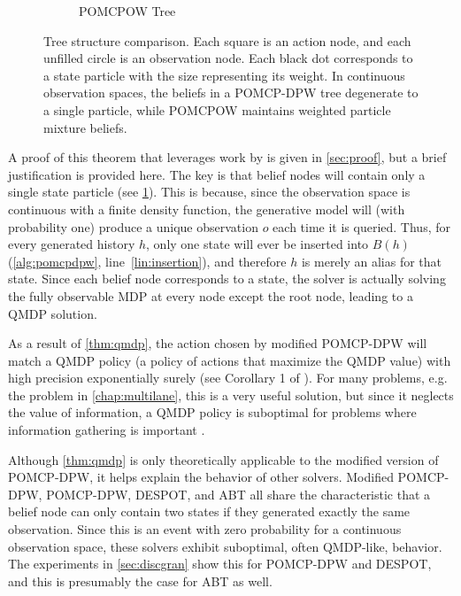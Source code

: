 \begin{figure}[htpb]
\begin{subfigure}[b]{0.45\columnwidth}
        \caption{POMCPOW Tree}
    \end{subfigure}
    \caption[POMCP-DPW and POMCPOW tree structure comparison]{Tree structure comparison. Each square is an action node, and each unfilled circle is an observation node. Each black dot corresponds to a state particle with the size representing its weight. In continuous observation spaces, the beliefs in a POMCP-DPW tree degenerate to a single particle, while POMCPOW maintains weighted particle mixture beliefs.}
    \label{fig:treecomp}
\end{figure}



A proof of this theorem that leverages work by \citet{auger2013continuous} is given in \cref{sec:proof}, but a brief justification is provided here.
The key is that belief nodes will contain only a single state particle (see \cref{fig:treecomp}).
This is because, since the observation space is continuous with a finite density function, the generative model will (with probability one) produce a unique observation $o$ each time it is queried.
Thus, for every generated history $h$, only one state will ever be inserted into $B(h)$ (\cref{alg:pomcpdpw}, line~\ref{lin:insertion}), and therefore $h$ is merely an alias for that state. 
Since each belief node corresponds to a state, the solver is actually solving the fully observable MDP at every node except the root node, leading to a QMDP solution.

As a result of \cref{thm:qmdp}, the action chosen by modified POMCP-DPW will match a QMDP policy (a policy of actions that maximize the QMDP value) with high precision exponentially surely (see Corollary 1 of \citet{auger2013continuous}).
For many problems, e.g. the problem in \cref{chap:multilane}, this is a very useful solution, but since it neglects the value of information, a QMDP policy is suboptimal for problems where information gathering is important \cite{littman1995learning,kochenderfer2015decision}.

Although \cref{thm:qmdp} is only theoretically applicable to the modified version of POMCP-DPW, it helps explain the behavior of other solvers.
Modified POMCP-DPW, POMCP-DPW, DESPOT, and ABT all share the characteristic that a belief node can only contain two states if they generated exactly the same observation.
Since this is an event with zero probability for a continuous observation space, these solvers exhibit suboptimal, often QMDP-like, behavior.
The experiments in \cref{sec:discgran} show this for POMCP-DPW and DESPOT, and this is presumably the case for ABT as well.


